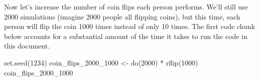 \documentclass[
]{book}
\newenvironment{Shaded}{\begin{snugshade}}{\end{snugshade}}
\newcommand{\DecValTok}[1]{\textcolor[rgb]{0.00,0.00,0.81}{#1}}
\newcommand{\FunctionTok}[1]{\textcolor[rgb]{0.00,0.00,0.00}{#1}}
\newcommand{\NormalTok}[1]{#1}
\newcommand{\OtherTok}[1]{\textcolor[rgb]{0.56,0.35,0.01}{#1}}
\newcommand{\SpecialCharTok}[1]{\textcolor[rgb]{0.00,0.00,0.00}{#1}}
\begin{document}
Now let's increase the number of coin flips each person performs. We'll still use 2000 simulations (imagine 2000 people all flipping coins), but this time, each person will flip the coin 1000 times instead of only 10 times. The first code chunk below accounts for a substantial amount of the time it takes to run the code in this document.

\begin{Shaded}
\begin{Highlighting}[]
\FunctionTok{set.seed}\NormalTok{(}\DecValTok{1234}\NormalTok{)}
\NormalTok{coin\_flips\_2000\_1000 }\OtherTok{\textless{}{-}} \FunctionTok{do}\NormalTok{(}\DecValTok{2000}\NormalTok{) }\SpecialCharTok{*} \FunctionTok{rflip}\NormalTok{(}\DecValTok{1000}\NormalTok{)}
\NormalTok{coin\_flips\_2000\_1000}
\end{Highlighting}
\end{Shaded}
\end{document}
